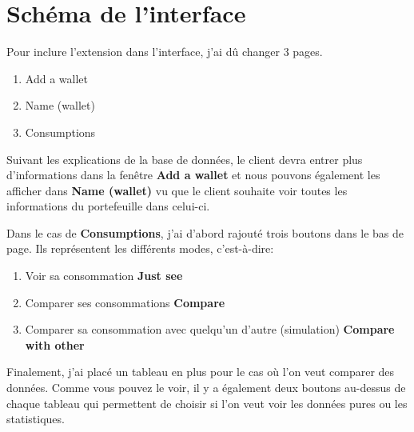 \section{Schéma de l'interface}

\begin{flushleft}
Pour inclure l'extension dans l'interface, j'ai dû changer 3 pages.
\end{flushleft}

\begin{enumerate}[-]
\item Add a wallet
\item Name (wallet)
\item Consumptions
\end{enumerate}

\begin{flushleft}
Suivant les explications de la base de données, le client devra entrer plus d'informations dans la fenêtre \textbf{Add a wallet} et nous pouvons également les afficher dans \textbf{Name (wallet)} vu que le client souhaite voir toutes les informations du portefeuille dans celui-ci.
\end{flushleft}

\begin{flushleft}
Dans le cas de \textbf{Consumptions}, j'ai d'abord rajouté trois boutons dans le bas de page. Ils représentent les différents modes, c'est-à-dire:
\end{flushleft}

\begin{enumerate}[-]
\item Voir sa consommation \textbf{Just see}
\item Comparer ses consommations \textbf{Compare}
\item Comparer sa consommation avec quelqu'un d'autre (simulation) \textbf{Compare with other}
\end{enumerate}

\begin{flushleft}
Finalement, j'ai placé un tableau en plus pour le cas où l'on veut comparer des données. Comme vous pouvez le voir, il y a également deux boutons au-dessus de chaque tableau qui permettent de choisir si l'on veut voir les données pures ou les statistiques.
\end{flushleft}

